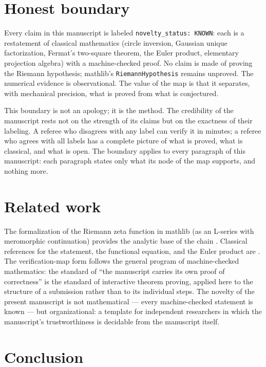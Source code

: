 \documentclass[sigplan,10pt,anonymous,review]{acmart}
\begin{document}
\section{Honest boundary}

Every claim in this manuscript is labeled \texttt{novelty\_status: KNOWN}:
each is a restatement of classical mathematics (circle inversion,
Gaussian unique factorization, Fermat's two-square theorem, the Euler
product, elementary projection algebra) with a machine-checked proof. No
claim is made of proving the Riemann hypothesis; mathlib's
\texttt{RiemannHypothesis} remains unproved. The numerical evidence is
observational. The value of the map is that it separates, with mechanical
precision, what is proved from what is conjectured.

This boundary is not an apology; it is the method. The credibility of
the manuscript rests not on the strength of its claims but on the
exactness of their labeling. A referee who disagrees with any label can
verify it in minutes; a referee who agrees with all labels has a
complete picture of what is proved, what is classical, and what is open.
The boundary applies to every paragraph of this manuscript: each
paragraph states only what its node of the map supports, and nothing
more.

\section{Related work}

The formalization of the Riemann zeta function in mathlib (as an L-series
with meromorphic continuation) provides the analytic base of the chain
\cite{mathlib,lean4}. Classical references for the statement, the
functional equation, and the Euler product are
\cite{edwards1974riemann,titchmarsh1986theory,hardy2008introduction}.
The verification-map form follows the general program of machine-checked
mathematics: the standard of ``the manuscript carries its own proof of
correctness'' is the standard of interactive theorem proving, applied
here to the structure of a submission rather than to its individual
steps. The novelty of the present manuscript is not mathematical ---
every machine-checked statement is known --- but organizational: a
template for independent researchers in which the manuscript's
trustworthiness is decidable from the manuscript itself.

\section{Conclusion}
\end{document}
